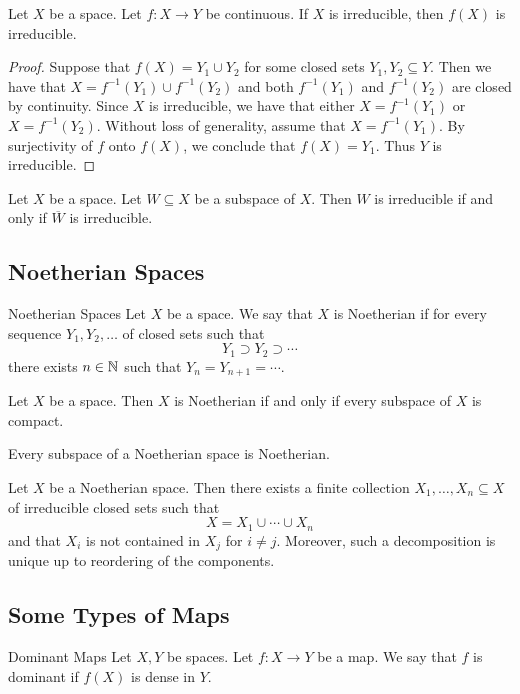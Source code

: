 \documentclass[a4paper]{article}
\begin{document}
\begin{prp}{}{} Let $X$ be a space. Let $f:X\to Y$ be continuous. If $X$ is irreducible, then $f(X)$ is irreducible. \tcbline
\begin{proof}
Suppose that $f(X)=Y_1\cup Y_2$ for some closed sets $Y_1,Y_2\subseteq Y$. Then we have that $X=f^{-1}(Y_1)\cup f^{-1}(Y_2)$ and both $f^{-1}(Y_1)$ and $f^{-1}(Y_2)$ are closed by continuity. Since $X$ is irreducible, we have that either $X=f^{-1}(Y_1)$ or $X=f^{-1}(Y_2)$. Without loss of generality, assume that $X=f^{-1}(Y_1)$. By surjectivity of $f$ onto $f(X)$, we conclude that $f(X)=Y_1$. Thus $Y$ is irreducible. 
\end{proof}
\end{prp}

\begin{lmm}{}{} Let $X$ be a space. Let $W\subseteq X$ be a subspace of $X$. Then $W$ is irreducible if and only if $\overline{W}$ is irreducible. 
\end{lmm}

\subsection{Noetherian Spaces}
\begin{defn}{Noetherian Spaces}{} Let $X$ be a space. We say that $X$ is Noetherian if for every sequence $Y_1,Y_2,\dots$ of closed sets such that $$Y_1\supset Y_2\supset\cdots$$ there exists $n\in\mathbb{N}$ such that $Y_n=Y_{n+1}=\cdots$. 
\end{defn}

\begin{prp}{}{} Let $X$ be a space. Then $X$ is Noetherian if and only if every subspace of $X$ is compact. 
\end{prp}

\begin{prp}{}{} Every subspace of a Noetherian space is Noetherian. 
\end{prp}

\begin{thm}{}{} Let $X$ be a Noetherian space. Then there exists a finite collection $X_1,\dots,X_n\subseteq X$ of irreducible closed sets such that $$X=X_1\cup\cdots\cup X_n$$ and that $X_i$ is not contained in $X_j$ for $i\neq j$. Moreover, such a decomposition is unique up to reordering of the components. 
\end{thm}

\subsection{Some Types of Maps}
\begin{defn}{Dominant Maps}{} Let $X,Y$ be spaces. Let $f:X\to Y$ be a map. We say that $f$ is dominant if $f(X)$ is dense in $Y$. 
\end{defn}
\end{document}
